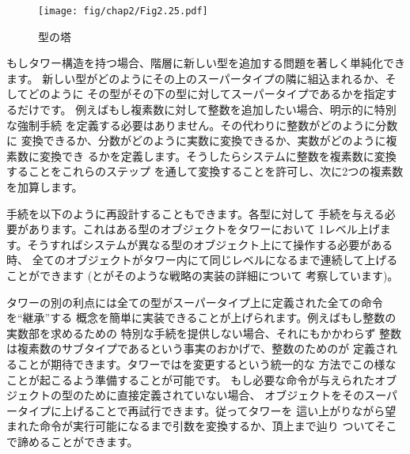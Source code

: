 \begin{figure}[tb]
\label{Figure 2.25}
\centering
\begin{comment}
\heading{Figure 2.25:} A tower of types.

\begin{example}
 complex
   ^
   |
  real
   ^
   |
rational
   ^
   |
integer
\end{example}
\end{comment}
\texttt{[image: fig/chap2/Fig2.25.pdf]}
\par\bigskip
\noindent
{} 型の塔
\end{figure}

\noindent
もしタワー構造を持つ場合、階層に新しい型を追加する問題を著しく単純化できます。
新しい型がどのようにその上のスーパータイプの隣に組込まれるか、そしてどのように
その型がその下の型に対してスーパータイプであるかを指定するだけです。
例えばもし複素数に対して整数を追加したい場合、明示的に特別な強制手続
を定義する必要はありません。その代わりに整数がどのように分数に
変換できるか、分数がどのように実数に変換できるか、実数がどのように複素数に変換でき
るかを定義します。そうしたらシステムに整数を複素数に変換することをこれらのステップ
を通して変換することを許可し、次に2つの複素数を加算します。


手続を以下のように再設計することもできます。各型に対して
手続を与える必要があります。これはある型のオブジェクトをタワーにおいて
1レベル上げます。そうすればシステムが異なる型のオブジェクト上にて操作する必要がある時、
全てのオブジェクトがタワー内にて同じレベルになるまで連続して上げることができます
(とがそのような戦略の実装の詳細について
考察しています)。



タワーの別の利点には全ての型がスーパータイプ上に定義された全ての命令を``継承''する
概念を簡単に実装できることが上げられます。例えばもし整数の実数部を求めるための
特別な手続を提供しない場合、それにもかかわらず
整数は複素数のサブタイプであるという事実のおかげで、整数のためのが
定義されることが期待できます。タワーではを変更するという統一的な
方法でこの様なことが起こるよう準備することが可能です。
もし必要な命令が与えられたオブジェクトの型のために直接定義されていない場合、
オブジェクトをそのスーパータイプに上げることで再試行できます。従ってタワーを
這い上がりながら望まれた命令が実行可能になるまで引数を変換するか、頂上まで辿り
ついてそこで諦めることができます。



